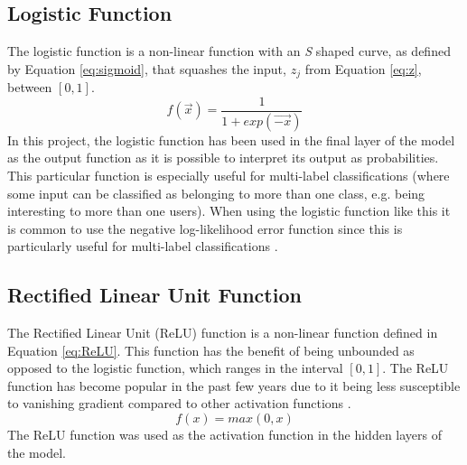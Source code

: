 \subsection{Logistic Function}\label{sec:sigmoid_function}
The logistic function is a non-linear function with an \textit{S} shaped curve, as defined by Equation \ref{eq:sigmoid}, that squashes the input, $z_j$ from Equation \ref{eq:z}, between $[0, 1]$.
\begin{equation}\label{eq:sigmoid}
    f(\vec{x})=\frac{1}{1+exp(\vec{-x})}
\end{equation}
In this project, the logistic function has been used in the final layer of the model as the output function as it is possible to interpret its output as probabilities. This particular function is especially useful for multi-label classifications (where some input can be classified as belonging to more than one class, e.g. being interesting to more than one users). When using the logistic function like this it is common to use the negative log-likelihood error function since this is particularly useful for multi-label classifications \parencite{bishop1995neural}.

\subsection{Rectified Linear Unit Function}\label{sec:relu}
The Rectified Linear Unit (ReLU) function is a non-linear function defined in Equation \ref{eq:ReLU}. This function has the benefit of being unbounded as opposed to the logistic function, which ranges in the interval $[0, 1]$. The ReLU function has become popular in the past few years due to it being less susceptible to vanishing gradient compared to other activation functions \parencite{glorot2011deep, lecun2015deep}.
\begin{equation}\label{eq:ReLU}
    f(x) = max(0,x)
\end{equation}
The ReLU function was used as the activation function in the hidden layers of the model.

